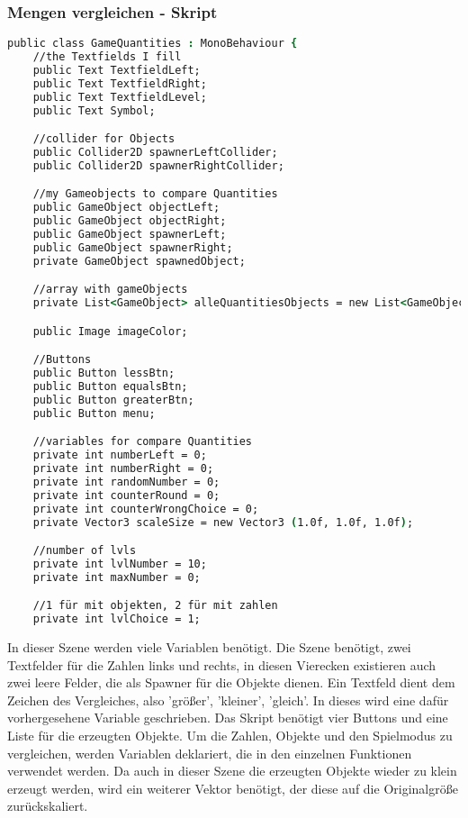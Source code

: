 \subsubsection{Mengen vergleichen - Skript}
\begin{lstlisting}[language=csh, caption={GameQuantities.cs Variablen-Deklaration}]
public class GameQuantities : MonoBehaviour {
	//the Textfields I fill
	public Text TextfieldLeft;
	public Text TextfieldRight;
	public Text TextfieldLevel;
	public Text Symbol;

	//collider for Objects
	public Collider2D spawnerLeftCollider;
	public Collider2D spawnerRightCollider;

	//my Gameobjects to compare Quantities
	public GameObject objectLeft;
	public GameObject objectRight;
	public GameObject spawnerLeft;
	public GameObject spawnerRight;
	private GameObject spawnedObject;

	//array with gameObjects
	private List<GameObject> alleQuantitiesObjects = new List<GameObject>(40);

	public Image imageColor;

	//Buttons
	public Button lessBtn;
	public Button equalsBtn;
	public Button greaterBtn;
	public Button menu;

	//variables for compare Quantities
	private int numberLeft = 0;
	private int numberRight = 0;
	private int randomNumber = 0;
	private int counterRound = 0;
	private int counterWrongChoice = 0;
	private Vector3 scaleSize = new Vector3 (1.0f, 1.0f, 1.0f);

	//number of lvls
	private int lvlNumber = 10;
	private int maxNumber = 0;

	//1 für mit objekten, 2 für mit zahlen
	private int lvlChoice = 1;
\end{lstlisting}
In dieser Szene werden viele Variablen benötigt. Die Szene benötigt, zwei Textfelder für die Zahlen links und rechts, in diesen Vierecken existieren auch zwei leere Felder, die als Spawner für die Objekte dienen. Ein Textfeld dient dem Zeichen des Vergleiches, also 'größer', 'kleiner', 'gleich'. In dieses wird eine dafür vorhergesehene Variable geschrieben. Das Skript benötigt vier Buttons und eine Liste für die erzeugten Objekte. Um die Zahlen, Objekte und den Spielmodus zu vergleichen, werden Variablen deklariert, die in den einzelnen Funktionen verwendet werden. Da auch in dieser Szene die erzeugten Objekte wieder zu klein erzeugt werden, wird ein weiterer Vektor benötigt, der diese auf die Originalgröße zurückskaliert.\\
